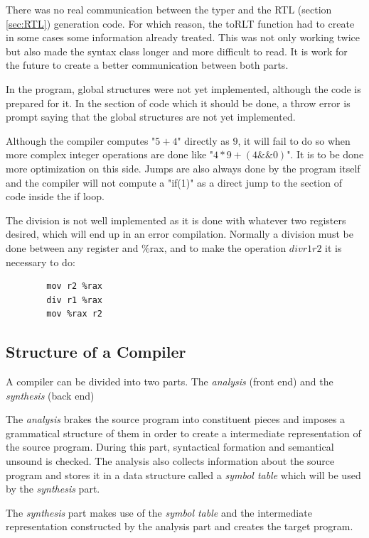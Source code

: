 \documentclass[conference]{IEEEtran}
\begin{document}
There was no real communication between the typer and the RTL (section \ref{sec:RTL}) generation code. For which reason, the toRLT function had to create in some cases some information already treated. This was not only working twice but also made the syntax class longer and more difficult to read. It is work for the future to create a better communication between both parts.

In the program, global structures were not yet implemented, although the code is prepared for it. In the section of code which it should be done, a throw error is prompt saying that the global structures are not yet implemented.

Although the compiler computes "$5 + 4$" directly as $9$, it will fail to do so when more complex integer operations are done like "$4 * 9 + (4 \&\& 0)$". It is to be done more optimization on this side. Jumps are also always done by the program itself and the compiler will not compute a "if(1)" as a direct jump to the section of code inside the if loop.

The division is not well implemented as it is done with whatever two registers desired, which will end up in an error compilation. Normally a division must be done between any register and \%rax, and to make the operation \(div r1 r2\) it is necessary to do:
\begin{lstlisting}
		mov r2 %rax
		div r1 %rax
		mov %rax r2
\end{lstlisting}


\subsection{Structure of a Compiler}\label{sub_structure_of_a_compiler}

A compiler can be divided into two parts. The \textit{analysis} (front end) and the \textit{synthesis} (back end)

The \textit{analysis} brakes the source program into constituent pieces and imposes a grammatical structure of them in order to create a intermediate representation of the source program. During this part, syntactical formation and semantical unsound is checked. The analysis also collects information about the source program and stores it in a data structure called a \textit{symbol table} which will be used by the \textit{synthesis} part.

The \textit{synthesis} part makes use of the \textit{symbol table} and the intermediate representation constructed by the analysis part and creates the target program.
\end{document}
